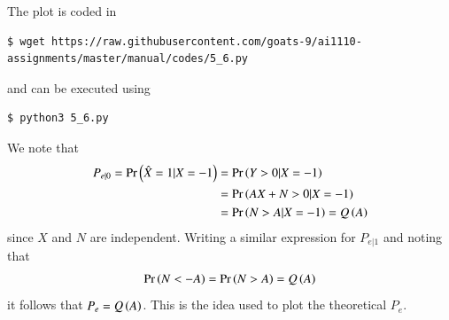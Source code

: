 \documentclass[journal,12pt,twocolumn]{IEEEtran}
\renewcommand\thesection{\arabic{section}}
\begin{document}
\begin{enumerate}[label=\thesection.\arabic*
,ref=\thesection.\theenumi]
\solution
The plot is coded in 
\begin{lstlisting}
$ wget https://raw.githubusercontent.com/goats-9/ai1110-assignments/master/manual/codes/5_6.py
\end{lstlisting}
and can be executed using
\begin{lstlisting}
$ python3 5_6.py
\end{lstlisting}
We note that 
\begin{align}
	P_{e|0} = \Pr\left(\hat{X} = 1 | X = -1\right) &= \Pr\left(Y > 0 | X = -1\right) \\
	&= \Pr\left(AX + N > 0 | X = -1\right) \\
	&= \Pr\left(N > A | X = -1\right) = Q\left(A\right)
\end{align}
since $X$ and $N$ are independent. Writing a similar expression for $P_{e|1}$ and noting that 
\begin{align}
	\Pr\left(N < -A\right) = \Pr\left(N > A\right) = Q\left(A\right)
\end{align}
it follows that $P_e = Q\left(A\right)$. This is the idea used to plot the theoretical $P_e$.
\end{enumerate}
\end{document}
